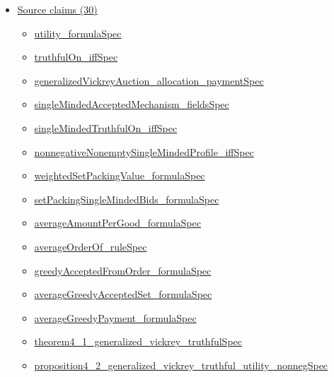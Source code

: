 \documentclass[10pt]{article}
\begin{document}
\begin{itemize}[leftmargin=1.2em]
\begin{itemize}[leftmargin=1.2em]
\item \hyperlink{library-prerequisite-e246069aab04c63d}{EconCSLib.Complexity.RandomizedComplexityClassModel.coNP}
\item \hyperlink{library-prerequisite-94c3587a79464c32}{EconCSLib.Complexity.RandomizedComplexityClassModel.coRP}
\item \hyperlink{library-prerequisite-48794068fb9ca98d}{EconCSLib.Complexity.RandomizedComplexityClassModel.toComplexityClassModel}
\end{itemize}
\item \hyperlink{source-section-f10b5f68e4acf3dc}{Source claims (30)}
\begin{itemize}[leftmargin=1.2em]
\item \hyperlink{source-claim-6ca038a02a554dfc}{utility\_formulaSpec}
\item \hyperlink{source-claim-c2b89af225180f75}{truthfulOn\_iffSpec}
\item \hyperlink{source-claim-c6037488ca244560}{generalizedVickreyAuction\_allocation\_paymentSpec}
\item \hyperlink{source-claim-c9e7c200f4c7853a}{singleMindedAcceptedMechanism\_fieldsSpec}
\item \hyperlink{source-claim-6f208bff80c2a325}{singleMindedTruthfulOn\_iffSpec}
\item \hyperlink{source-claim-790fa5df2624ee60}{nonnegativeNonemptySingleMindedProfile\_iffSpec}
\item \hyperlink{source-claim-c845f64c3466b312}{weightedSetPackingValue\_formulaSpec}
\item \hyperlink{source-claim-caa2c2151c2ff699}{setPackingSingleMindedBids\_formulaSpec}
\item \hyperlink{source-claim-7b218a9a6f89df2a}{averageAmountPerGood\_formulaSpec}
\item \hyperlink{source-claim-49512ac602bfb45d}{averageOrderOf\_ruleSpec}
\item \hyperlink{source-claim-b6d878da6257cc9c}{greedyAcceptedFromOrder\_formulaSpec}
\item \hyperlink{source-claim-7aabe039cb95f484}{averageGreedyAcceptedSet\_formulaSpec}
\item \hyperlink{source-claim-2217276c338da214}{averageGreedyPayment\_formulaSpec}
\item \hyperlink{source-claim-58162ce0170b67c7}{theorem4\_1\_generalized\_vickrey\_truthfulSpec}
\item \hyperlink{source-claim-9a3ae33d2b205d48}{proposition4\_2\_generalized\_vickrey\_truthful\_utility\_nonnegSpec}

\end{itemize}
\end{itemize}
\end{document}

